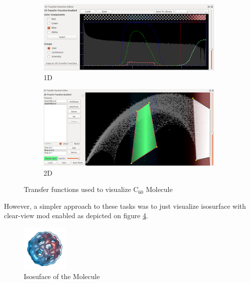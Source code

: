 \documentclass{article}
\begin{document}
\begin{figure}
	\centering
	\begin{subfigure}[h]{0.45\textwidth}
		\includegraphics[width=\textwidth]{1d-transfer.png}
		\caption{1D}
		\label{fig:1dt}
	\end{subfigure}
	\begin{subfigure}[h]{0.45\textwidth}
		\includegraphics[width=\textwidth]{2d-trasfer.png}
		\caption{2D}
		\label{fig:2dt}
	\end{subfigure}
	\caption{Transfer functions used to visualize $\text{C}_{60}$ Molecule}\label{fig:2}
\end{figure}

However, a simpler approach to these tasks was to just visualize isosurface with clear-view mod enabled as depicted on figure \ref{fig:3}.
\begin{figure}[h!]
	\begin{center}
		\includegraphics[width=0.2\textwidth]{isosurface.png}
		\caption{Isosuface of the Molecule}
		\label{fig:3}
	\end{center}
\end{figure}
\end{document}
